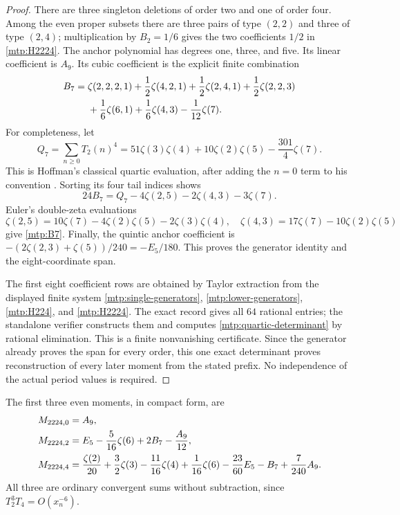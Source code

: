 \begin{proof}
There are three singleton deletions of order two and one of order four.
Among the even proper subsets there are three pairs of type $(2,2)$
and three of type $(2,4)$; multiplication by $B_2=1/6$ gives the two
coefficients $1/2$ in \eqref{mtp:H2224}. The anchor polynomial has
degrees one, three, and five. Its linear coefficient is $A_9$.
Its cubic coefficient is the explicit finite combination
\begin{align}
 B_7={}&\zeta(2,2,2,1)+\frac12\zeta(4,2,1)+\frac12\zeta(2,4,1)
          +\frac12\zeta(2,2,3)\notag\\
       &+\frac16\zeta(6,1)+\frac16\zeta(4,3)-\frac1{12}\zeta(7).
       \label{mtp:B7-MZV}
\end{align}
For completeness, let
\[
 Q_7=\sum_{n\ge0}T_2(n)^4
     =51\zeta(3)\zeta(4)+10\zeta(2)\zeta(5)-\frac{301}{4}\zeta(7).
\]
This is Hoffman's classical quartic evaluation, after adding the
$n=0$ term to his convention \cite[following Corollary 4.4]{Hoffman}.
Sorting its four tail indices shows
\[
 24B_7=Q_7-4\zeta(2,5)-2\zeta(4,3)-3\zeta(7).
\]
Euler's double-zeta evaluations
\[
 \zeta(2,5)=10\zeta(7)-4\zeta(2)\zeta(5)-2\zeta(3)\zeta(4),
 \quad \zeta(4,3)=17\zeta(7)-10\zeta(2)\zeta(5)
\]
give \eqref{mtp:B7}. Finally, the quintic anchor coefficient is
$-(2\zeta(2,3)+\zeta(5))/240=-E_5/180$.
This proves the generator identity and the eight-coordinate span.

The first eight coefficient rows are obtained by Taylor extraction
from the displayed finite system
\eqref{mtp:single-generators}, \eqref{mtp:lower-generators},
\eqref{mtp:H224}, and \eqref{mtp:H2224}. The exact record gives all
$64$ rational entries; the standalone verifier constructs them and
computes \eqref{mtp:quartic-determinant} by rational elimination.
This is a finite nonvanishing certificate. Since the generator already
proves the span for every order, this one exact determinant proves
reconstruction of every later moment from the stated prefix.
No independence of the actual period values is required.
\end{proof}

The first three even moments, in compact form, are
\begin{align}
 M_{2224,0}&=A_9,\notag\\
 M_{2224,2}&=E_5-\frac5{16}\zeta(6)+2B_7-\frac{A_9}{12},
       \label{mtp:quartic-first}\\
 M_{2224,4}&=\frac{\zeta(2)}{20}+\frac32\zeta(3)-\frac{11}{16}\zeta(4)
             +\frac1{16}\zeta(6)-\frac{23}{60}E_5-B_7+\frac7{240}A_9.
       \notag
\end{align}
All three are ordinary convergent sums without subtraction, since
$T_2^3T_4=O(x_n^{-6})$.

